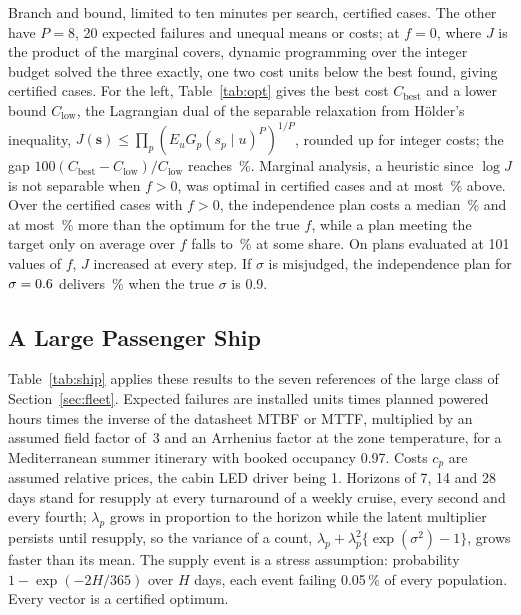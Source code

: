 Branch and bound, limited to ten minutes per search, certified \seCertBB{}
cases. The other \seUnprovedBB{} have $P=8$, 20 expected failures and unequal
means or costs; at $f=0$, where $J$ is the product of the marginal covers,
dynamic programming over the integer budget solved the three exactly, one two
cost units below the best found, giving \seCert{} certified cases. For the
\seUnproved{} left, Table~\ref{tab:opt} gives the best cost $C_{\mathrm{best}}$
and a lower bound $C_{\mathrm{low}}$, the Lagrangian dual of the separable
relaxation from H\"older's inequality,
$J(\mathbf s)\le\prod_p(E_u G_p(s_p\mid u)^P)^{1/P}$, rounded up for integer
costs; the gap $100(C_{\mathrm{best}}-C_{\mathrm{low}})/C_{\mathrm{low}}$
reaches \seGapHi\,\%. Marginal analysis, a heuristic since $\log J$
is not separable when $f>0$, was optimal in \seGreedyCertOpt{} certified cases
and at most \seGreedyCertMax\,\% above. Over the \seCertPos{} certified cases
with $f>0$, the independence plan costs a median \seIndCertMed\,\% and at most
\seIndCertMax\,\% more than the optimum for the true $f$, while a plan meeting the target only on average over $f$ falls to
\rvAvgJointMin\,\% at some share. On \seMonoCases{} plans evaluated at 101
values of $f$, $J$ increased at every step. If $\sigma$ is misjudged, the
independence plan for $\sigma=0.6$ delivers \seSigJointMin\,\% when the
true $\sigma$ is 0.9.

\subsection{A Large Passenger Ship}
\label{sec:ship}
Table~\ref{tab:ship} applies these results to the seven references of the
large class of Section~\ref{sec:fleet}. Expected failures are installed units
times planned powered hours times the inverse of the datasheet MTBF or MTTF,
multiplied by an assumed
field factor of~3 and an Arrhenius factor at the zone temperature, for a
Mediterranean summer itinerary with booked occupancy 0.97. Costs $c_p$ are
assumed relative prices, the cabin LED driver being 1. Horizons of 7, 14 and
28 days stand for resupply at every turnaround of a weekly cruise, every
second and every fourth; $\lambda_p$ grows in proportion to the horizon while
the latent multiplier persists until resupply, so the variance of a count,
$\lambda_p+\lambda_p^2\{\exp(\sigma^2)-1\}$, grows faster than its mean. The
supply event is a stress assumption: probability $1-\exp(-2H/365)$ over $H$
days, each event failing 0.05\,\% of every population. Every vector is a
certified optimum.

